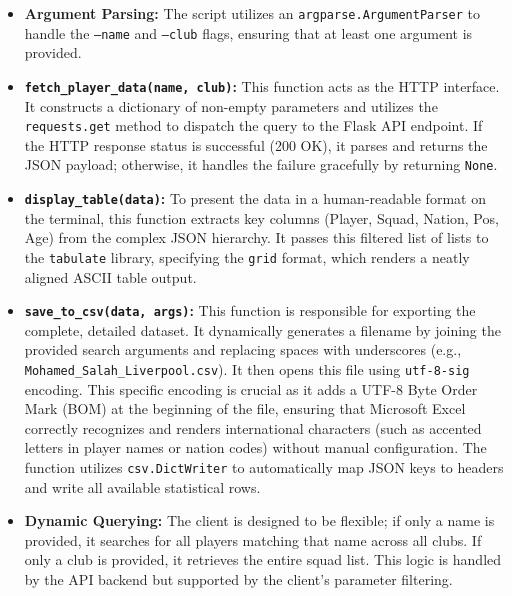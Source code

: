 \documentclass[a4paper,12pt]{report}
\begin{document}
\begin{itemize}
    \item \textbf{Argument Parsing:} The script utilizes an \texttt{argparse.}\allowbreak\texttt{Argument}\allowbreak\texttt{Parser} to handle the \texttt{--name} and \texttt{--club} flags, ensuring that at least one argument is provided.
    
    \item \textbf{\texttt{fetch\_}\allowbreak\texttt{player\_}\allowbreak\texttt{data(name, club)}:} This function acts as the HTTP interface. It constructs a dictionary of non-empty parameters and utilizes the \texttt{requests.get} method to dispatch the query to the Flask API endpoint. If the HTTP response status is successful (200 OK), it parses and returns the JSON payload; otherwise, it handles the failure gracefully by returning \texttt{None}.
    
    \item \textbf{\texttt{display\_table(data)}:} To present the data in a human-readable format on the terminal, this function extracts key columns (Player, Squad, Nation, Pos, Age) from the complex JSON hierarchy. It passes this filtered list of lists to the \texttt{tabulate} library, specifying the \texttt{grid} format, which renders a neatly aligned ASCII table output.
    
    \item \textbf{\texttt{save\_to\_csv(data, args)}:} This function is responsible for exporting the complete, detailed dataset. It dynamically generates a filename by joining the provided search arguments and replacing spaces with underscores (e.g., \texttt{Mohamed\_}\allowbreak\texttt{Salah\_}\allowbreak\texttt{Liverpool.csv}). It then opens this file using \texttt{utf-8-sig} encoding. This specific encoding is crucial as it adds a UTF-8 Byte Order Mark (BOM) at the beginning of the file, ensuring that Microsoft Excel correctly recognizes and renders international characters (such as accented letters in player names or nation codes) without manual configuration. The function utilizes \texttt{csv.DictWriter} to automatically map JSON keys to headers and write all available statistical rows.

    \item \textbf{Dynamic Querying:} The client is designed to be flexible; if only a name is provided, it searches for all players matching that name across all clubs. If only a club is provided, it retrieves the entire squad list. This logic is handled by the API backend but supported by the client's parameter filtering.
\end{itemize}
\end{document}
